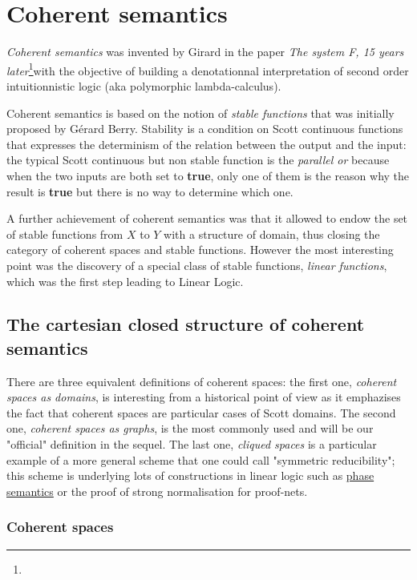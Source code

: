 \chapter{Coherent semantics}\label{coherent-semantics}

\emph{Coherent semantics} was invented by Girard in the paper \emph{The
system F, 15 years later}\footnote{}with the objective of building a
denotationnal interpretation of second order intuitionnistic logic (aka
polymorphic lambda-calculus).

Coherent semantics is based on the notion of \emph{stable functions}
that was initially proposed by Gérard Berry. Stability is a condition on
Scott continuous functions that expresses the determinism of the
relation between the output and the input: the typical Scott continuous
but non stable function is the \emph{parallel or} because when the two
inputs are both set to \textbf{true}, only one of them is the reason why
the result is \textbf{true} but there is no way to determine which one.

A further achievement of coherent semantics was that it allowed to endow
the set of stable functions from \(X\) to \(Y\) with a structure of
domain, thus closing the category of coherent spaces and stable
functions. However the most interesting point was the discovery of a
special class of stable functions, \emph{linear functions}, which was
the first step leading to Linear Logic.

\section{The cartesian closed structure of coherent semantics}\label{the-cartesian-closed-structure-of-coherent-semantics}

There are three equivalent definitions of coherent spaces: the first
one, \emph{coherent spaces as domains}, is interesting from a historical
point of view as it emphazises the fact that coherent spaces are
particular cases of Scott domains. The second one, \emph{coherent spaces
as graphs}, is the most commonly used and will be our "official"
definition in the sequel. The last one, \emph{cliqued spaces} is a
particular example of a more general scheme that one could call
"symmetric reducibility"; this scheme is underlying lots of
constructions in linear logic such as \href{phase_semantics}{phase
semantics} or the proof of strong normalisation for proof-nets.

\subsection{Coherent spaces}\label{coherent-spaces}

